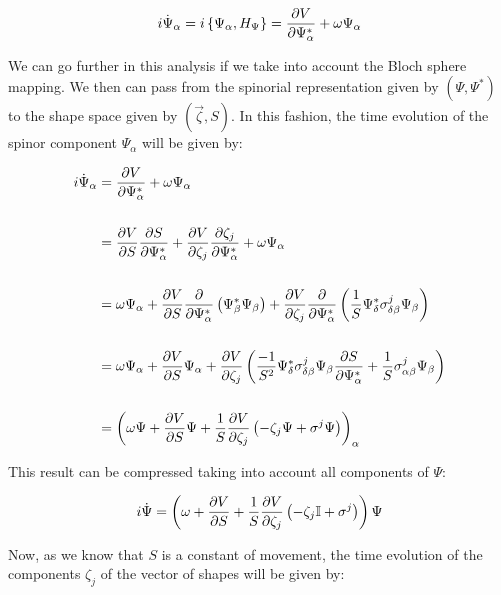 \begin{align*}
i\dot{\Psi}_\alpha = i\left\lbrace \Psi_\alpha, H_{\Psi} \right\rbrace = \frac{\partial V}{\partial \Psi_\alpha^*} + \omega \Psi_\alpha
\end{align*}

We can go further in this analysis if we take into account the Bloch sphere mapping. We then can pass from the spinorial representation given by $(\Psi,\Psi^*)$ to the shape space given by $(\vec{\zeta},S)$. In this fashion, the time evolution of the spinor component $\Psi_\alpha$ will be given by:

\begin{align*}
i\dot{\Psi}_\alpha &= \frac{\partial V}{\partial \Psi_\alpha^*} + \omega\Psi_\alpha\\
\\
&=  \frac{\partial V}{\partial S}\frac{\partial S}{\partial \Psi_\alpha^*}+ \frac{\partial V}{\partial \zeta_j}\frac{\partial \zeta_j}{\partial \Psi_\alpha^*} + \omega\Psi_\alpha  \\
\\
&= \omega \Psi_\alpha + \frac{\partial V}{\partial S}\frac{\partial}{\partial \Psi_\alpha^*}\left( \Psi^*_\beta\Psi_\beta \right) + \frac{\partial V}{\partial \zeta_j}\frac{\partial}{\partial \Psi_\alpha^*}\left( \frac{1}{S}\Psi^*_{\delta}\sigma^j_{\delta\beta}\Psi_\beta \right)\\
\\
&= \omega \Psi_\alpha + \frac{\partial V}{\partial S}\Psi_\alpha +\frac{\partial V}{\partial \zeta_j}\left(  \frac{-1}{S^2}\Psi^*_{\delta}\sigma^j_{\delta\beta}\Psi_\beta\frac{\partial S}{\partial \Psi_\alpha^*} +\frac{1}{S}\sigma^j_{\alpha\beta}\Psi_\beta \right)\\
\\
&= \left( \omega \Psi +\frac{\partial V}{\partial S}\Psi+ \frac{1}{S}\frac{\partial V}{\partial \zeta_j}\left( -\zeta_j \Psi + \sigma^j \Psi \right) \right)_\alpha
\end{align*}

This result can be compressed taking into account all components of $\Psi$:

\begin{equation}
i\dot{\Psi} = \left( \omega +\frac{\partial V}{\partial S}+ \frac{1}{S}\frac{\partial V}{\partial \zeta_j}\left( -\zeta_j \mathbb{I}  + \sigma^j  \right) \right)\Psi
\label{eq:Psi_time_ev}
\end{equation}

Now, as we know that $S$ is a constant of movement, the time evolution of the components $\zeta_j$  of the vector of shapes will be given by:

